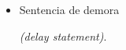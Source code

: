 \begin{itemize}
    \item \hypertarget{delay_statement}{Sentencia de demora} \emph{(delay statement)}.
\end{itemize}
